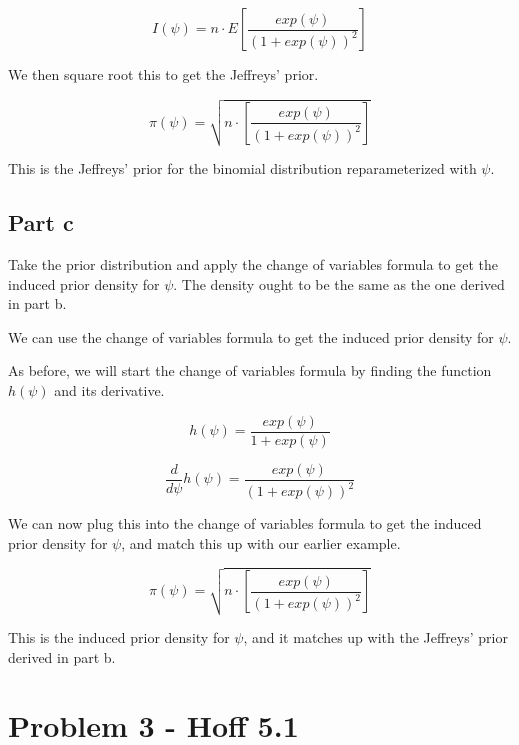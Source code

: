 \documentclass[12pt, letterpaper]{article}
\begin{document}
\begin{equation}
  I(\psi) = n \cdot E\left[\frac{exp(\psi)}{(1 + exp(\psi))^2}\right]
\end{equation} 

We then square root this to get the Jeffreys' prior. 

\begin{equation}
  \pi(\psi) = \sqrt{n \cdot \left[\frac{exp(\psi)}{(1 + exp(\psi))^2}\right]} 
\end{equation} 

This is the Jeffreys' prior for the binomial distribution reparameterized with $\psi$. 

\subsection{Part c}

Take the prior distribution and apply the change of variables formula to get the induced prior density for $\psi$. The density ought to be the same as the one derived in part b. 

We can use the change of variables formula to get the induced prior density for $\psi$. 

As before, we will start the change of variables formula by finding the function $h(\psi)$ and its derivative. 

\begin{equation}
  h(\psi) = \frac{exp(\psi)}{1 + exp(\psi)} 
\end{equation} 

\begin{equation}
  \frac{d}{d\psi}h(\psi) = \frac{exp(\psi)}{(1 + exp(\psi))^2} 
\end{equation} 

We can now plug this into the change of variables formula to get the induced prior density for $\psi$, and match this up with our earlier example. 

\begin{equation}
  \pi(\psi) = \sqrt{n \cdot \left[\frac{exp(\psi)}{(1 + exp(\psi))^2}\right]} 
\end{equation} 

This is the induced prior density for $\psi$, and it matches up with the Jeffreys' prior derived in part b. 

\section{Problem 3 - Hoff 5.1}
\end{document}
